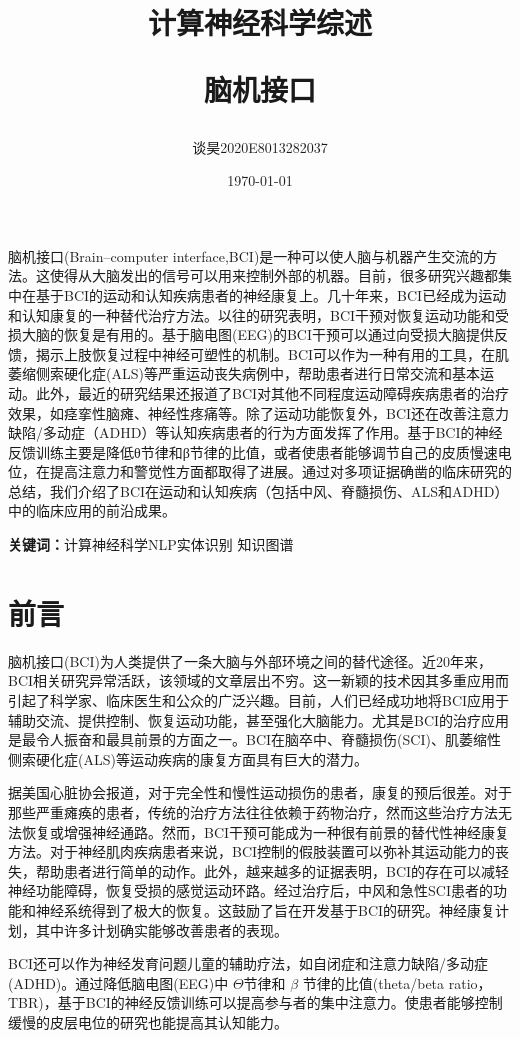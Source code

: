 \documentclass[UTF8,a4paper]{ctexart}
\title{\bfseries 计算神经科学综述 \\\begin{large}脑机接口\end{large}}
\author{谈昊\quad2020E8013282037}
\date{\today}
\begin{document}
\maketitle


\begin{center}
\parbox{130mm}{
脑机接口(Brain–computer interface,BCI)是一种可以使人脑与机器产生交流的方法。这使得从大脑发出的信号可以用来控制外部的机器。目前，很多研究兴趣都集中在基于BCI的运动和认知疾病患者的神经康复上。几十年来，BCI已经成为运动和认知康复的一种替代治疗方法。以往的研究表明，BCI干预对恢复运动功能和受损大脑的恢复是有用的。基于脑电图(EEG)的BCI干预可以通过向受损大脑提供反馈，揭示上肢恢复过程中神经可塑性的机制。BCI可以作为一种有用的工具，在肌萎缩侧索硬化症(ALS)等严重运动丧失病例中，帮助患者进行日常交流和基本运动。此外，最近的研究结果还报道了BCI对其他不同程度运动障碍疾病患者的治疗效果，如痉挛性脑瘫、神经性疼痛等。除了运动功能恢复外，BCI还在改善注意力缺陷/多动症（ADHD）等认知疾病患者的行为方面发挥了作用。基于BCI的神经反馈训练主要是降低θ节律和β节律的比值，或者使患者能够调节自己的皮质慢速电位，在提高注意力和警觉性方面都取得了进展。通过对多项证据确凿的临床研究的总结，我们介绍了BCI在运动和认知疾病（包括中风、脊髓损伤、ALS和ADHD）中的临床应用的前沿成果。
\par
\vspace{1mm}
{\bfseries 关键词：}计算神经科学\quad NLP\quad 实体识别 \quad 知识图谱}
\end{center}



\section{前言}
脑机接口(BCI)为人类提供了一条大脑与外部环境之间的替代途径。近20年来，BCI相关研究异常活跃，该领域的文章层出不穷。这一新颖的技术因其多重应用而引起了科学家、临床医生和公众的广泛兴趣。目前，人们已经成功地将BCI应用于辅助交流、提供控制、恢复运动功能，甚至强化大脑能力。尤其是BCI的治疗应用是最令人振奋和最具前景的方面之一。BCI在脑卒中、脊髓损伤(SCI)、肌萎缩性侧索硬化症(ALS)等运动疾病的康复方面具有巨大的潜力。
\par
据美国心脏协会报道，对于完全性和慢性运动损伤的患者，康复的预后很差。对于那些严重瘫痪的患者，传统的治疗方法往往依赖于药物治疗，然而这些治疗方法无法恢复或增强神经通路。然而，BCI干预可能成为一种很有前景的替代性神经康复方法。对于神经肌肉疾病患者来说，BCI控制的假肢装置可以弥补其运动能力的丧失，帮助患者进行简单的动作。此外，越来越多的证据表明，BCI的存在可以减轻神经功能障碍，恢复受损的感觉运动环路。经过治疗后，中风和急性SCI患者的功能和神经系统得到了极大的恢复。这鼓励了旨在开发基于BCI的研究。神经康复计划，其中许多计划确实能够改善患者的表现。
\par
BCI还可以作为神经发育问题儿童的辅助疗法，如自闭症和注意力缺陷/多动症(ADHD)。通过降低脑电图(EEG)中 $\Theta$节律和 $\beta$ 节律的比值(theta/beta ratio，TBR)，基于BCI的神经反馈训练可以提高参与者的集中注意力。使患者能够控制缓慢的皮层电位的研究也能提高其认知能力。
\end{document}
